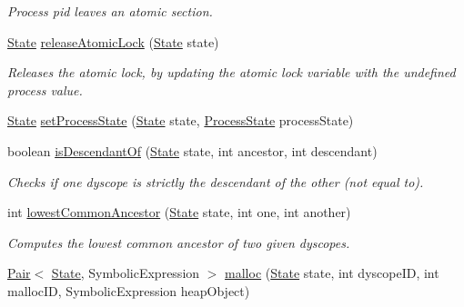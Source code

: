 \begin{DoxyCompactItemize}
\begin{DoxyCompactList}\small\item\em Process pid leaves an atomic section. \end{DoxyCompactList}\item 
\hyperlink{interfaceedu_1_1udel_1_1cis_1_1vsl_1_1civl_1_1state_1_1IF_1_1State}{State} \hyperlink{interfaceedu_1_1udel_1_1cis_1_1vsl_1_1civl_1_1state_1_1IF_1_1StateFactory_a1a81054b9e512c38bcf873ce54c36896}{release\+Atomic\+Lock} (\hyperlink{interfaceedu_1_1udel_1_1cis_1_1vsl_1_1civl_1_1state_1_1IF_1_1State}{State} state)
\begin{DoxyCompactList}\small\item\em Releases the atomic lock, by updating the atomic lock variable with the undefined process value. \end{DoxyCompactList}\item 
\hyperlink{interfaceedu_1_1udel_1_1cis_1_1vsl_1_1civl_1_1state_1_1IF_1_1State}{State} \hyperlink{interfaceedu_1_1udel_1_1cis_1_1vsl_1_1civl_1_1state_1_1IF_1_1StateFactory_a2f48636d5dba0d57c3e7cf63e9980b9d}{set\+Process\+State} (\hyperlink{interfaceedu_1_1udel_1_1cis_1_1vsl_1_1civl_1_1state_1_1IF_1_1State}{State} state, \hyperlink{interfaceedu_1_1udel_1_1cis_1_1vsl_1_1civl_1_1state_1_1IF_1_1ProcessState}{Process\+State} process\+State)
\item 
boolean \hyperlink{interfaceedu_1_1udel_1_1cis_1_1vsl_1_1civl_1_1state_1_1IF_1_1StateFactory_ab2ba56b706c95a3afbe32c54504c5b16}{is\+Descendant\+Of} (\hyperlink{interfaceedu_1_1udel_1_1cis_1_1vsl_1_1civl_1_1state_1_1IF_1_1State}{State} state, int ancestor, int descendant)
\begin{DoxyCompactList}\small\item\em Checks if one dyscope is strictly the descendant of the other (not equal to). \end{DoxyCompactList}\item 
int \hyperlink{interfaceedu_1_1udel_1_1cis_1_1vsl_1_1civl_1_1state_1_1IF_1_1StateFactory_a7bb8f08bb0e64d60c886d2cd482e9c80}{lowest\+Common\+Ancestor} (\hyperlink{interfaceedu_1_1udel_1_1cis_1_1vsl_1_1civl_1_1state_1_1IF_1_1State}{State} state, int one, int another)
\begin{DoxyCompactList}\small\item\em Computes the lowest common ancestor of two given dyscopes. \end{DoxyCompactList}\item 
\hyperlink{classedu_1_1udel_1_1cis_1_1vsl_1_1civl_1_1util_1_1IF_1_1Pair}{Pair}$<$ \hyperlink{interfaceedu_1_1udel_1_1cis_1_1vsl_1_1civl_1_1state_1_1IF_1_1State}{State}, Symbolic\+Expression $>$ \hyperlink{interfaceedu_1_1udel_1_1cis_1_1vsl_1_1civl_1_1state_1_1IF_1_1StateFactory_a2d470ef099fa677050a049e6ffb0090f}{malloc} (\hyperlink{interfaceedu_1_1udel_1_1cis_1_1vsl_1_1civl_1_1state_1_1IF_1_1State}{State} state, int dyscope\+I\+D, int malloc\+I\+D, Symbolic\+Expression heap\+Object)

\end{DoxyCompactItemize}
